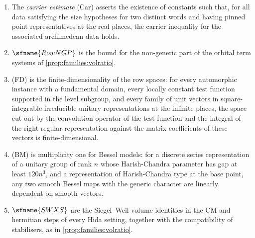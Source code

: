 \begin{definition}\label{pf:thmS-leaves:def:hyps}
\begin{enumerate}
\item The \emph{carrier estimate} (Car) asserts the existence of constants such that, for all data satisfying the
size hypotheses for two distinct words and having pinned point representatives at the real places, the carrier
inequality for the associated archimedean data holds.
\item $\sfname{RowNGP}$ is the bound for the non-generic part of the orbital term systems of
\cref{prop:families:volratio}.
\item (FD) is the finite-dimensionality of the row spaces: for every automorphic instance with a fundamental domain,
every locally constant test function supported in the level subgroup, and every family of unit vectors in
square-integrable irreducible unitary representations at the infinite places, the space cut out by the convolution
operator of the test function and the integral of the right regular representation against the matrix
coefficients of these vectors is finite-dimensional.
\item (BM) is multiplicity one for Bessel models: for a discrete series representation of a unitary group of rank $n$
whose Harish-Chandra parameter has gap at least $120n^3$, and a representation of Harish-Chandra type at the base
point, any two smooth Bessel maps with the generic character are linearly dependent on smooth vectors.
\item $\sfname{SWXS}$ are the Siegel--Weil volume identities in the CM and hermitian steps of every Hida setting,
together with the compatibility of stabilisers, as in \cref{prop:families:volratio}.
\end{enumerate}
\end{definition}

